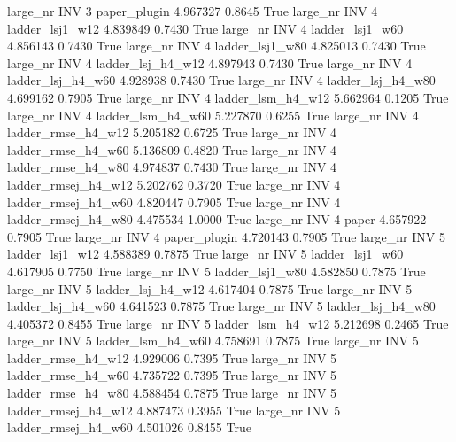   large_nr      INV                 3        paper_plugin   4.967327      0.8645    True
  large_nr      INV                 4     ladder_lsj1_w12   4.839849      0.7430    True
  large_nr      INV                 4     ladder_lsj1_w60   4.856143      0.7430    True
  large_nr      INV                 4     ladder_lsj1_w80   4.825013      0.7430    True
  large_nr      INV                 4   ladder_lsj_h4_w12   4.897943      0.7430    True
  large_nr      INV                 4   ladder_lsj_h4_w60   4.928938      0.7430    True
  large_nr      INV                 4   ladder_lsj_h4_w80   4.699162      0.7905    True
  large_nr      INV                 4   ladder_lsm_h4_w12   5.662964      0.1205    True
  large_nr      INV                 4   ladder_lsm_h4_w60   5.227870      0.6255    True
  large_nr      INV                 4  ladder_rmse_h4_w12   5.205182      0.6725    True
  large_nr      INV                 4  ladder_rmse_h4_w60   5.136809      0.4820    True
  large_nr      INV                 4  ladder_rmse_h4_w80   4.974837      0.7430    True
  large_nr      INV                 4 ladder_rmsej_h4_w12   5.202762      0.3720    True
  large_nr      INV                 4 ladder_rmsej_h4_w60   4.820447      0.7905    True
  large_nr      INV                 4 ladder_rmsej_h4_w80   4.475534      1.0000    True
  large_nr      INV                 4               paper   4.657922      0.7905    True
  large_nr      INV                 4        paper_plugin   4.720143      0.7905    True
  large_nr      INV                 5     ladder_lsj1_w12   4.588389      0.7875    True
  large_nr      INV                 5     ladder_lsj1_w60   4.617905      0.7750    True
  large_nr      INV                 5     ladder_lsj1_w80   4.582850      0.7875    True
  large_nr      INV                 5   ladder_lsj_h4_w12   4.617404      0.7875    True
  large_nr      INV                 5   ladder_lsj_h4_w60   4.641523      0.7875    True
  large_nr      INV                 5   ladder_lsj_h4_w80   4.405372      0.8455    True
  large_nr      INV                 5   ladder_lsm_h4_w12   5.212698      0.2465    True
  large_nr      INV                 5   ladder_lsm_h4_w60   4.758691      0.7875    True
  large_nr      INV                 5  ladder_rmse_h4_w12   4.929006      0.7395    True
  large_nr      INV                 5  ladder_rmse_h4_w60   4.735722      0.7395    True
  large_nr      INV                 5  ladder_rmse_h4_w80   4.588454      0.7875    True
  large_nr      INV                 5 ladder_rmsej_h4_w12   4.887473      0.3955    True
  large_nr      INV                 5 ladder_rmsej_h4_w60   4.501026      0.8455    True
